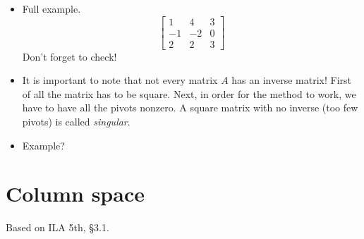 \documentclass[11pt,oneside]{amsbook}
\theoremstyle{definition}
\theoremstyle{plain}
\theoremstyle{definition}
\theoremstyle{remark}
\numberwithin{equation}{section}
\numberwithin{figure}{section}
\begin{document}
\begin{itemize}
\begin{align*}
    [A&\mid I]\\
    [E_1A&\mid E_1]\\
      &\vdots\\
    [E_m\cdots E_1A&\mid E_m\cdots E_1]\\
    [I&\mid A^{-1}]
  \end{align*}
\item Full example.
  \[\begin{bmatrix}1&4&3\\-1&-2&0\\2&2&3\end{bmatrix}
  \]
  Don't forget to check!
\item It is important to note that not every matrix $A$ has an inverse matrix! First of all the matrix has to be square. Next, in order for the method to work, we have to have all the pivots nonzero. A square matrix with no inverse (too few pivots) is called \emph{singular}.
\item Example?
\end{itemize}


\newpage
\section{Column space}

Based on ILA 5th, \S 3.1.
\end{document}
